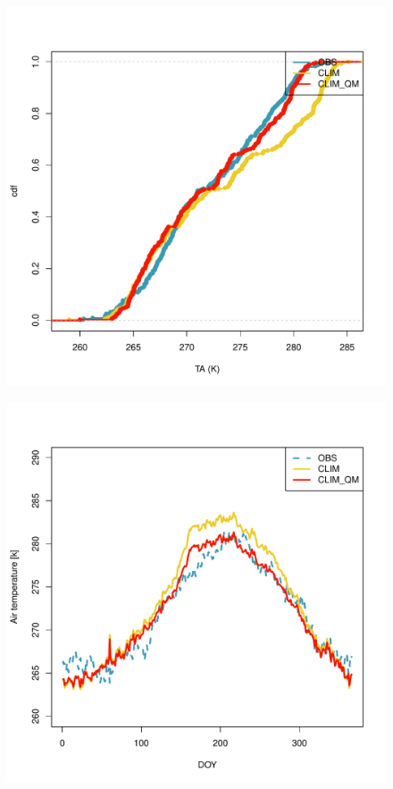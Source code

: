 \documentclass[hess, manuscript]{copernicus}
\begin{document}



%
 \clearpage
%
\begin{figure}[t]
\includegraphics[width=12cm]{"plots/TA_CDF.pdf"}
\caption{ }
\end{figure}

\begin{figure}[t]
\includegraphics[width=12cm]{"plots/TA_DOY.pdf"}
\caption{}
\end{figure}
\end{document}
